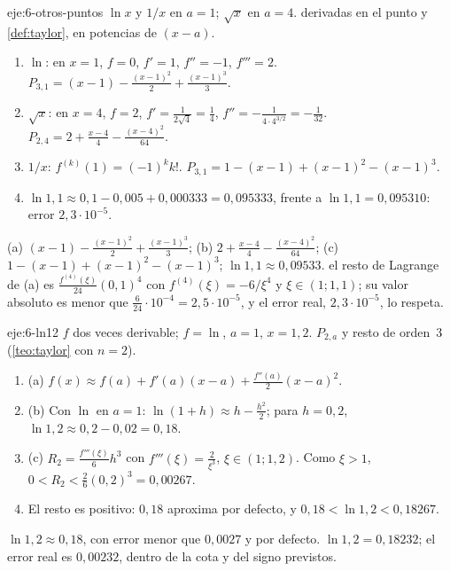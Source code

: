 \begin{solucion}{eje:6-otros-puntos}
\datos $\ln x$ y $1/x$ en $a=1$; $\sqrt x$ en $a=4$.
\planteamiento derivadas en el punto y \cref{def:taylor}, en potencias de $(x-a)$.
\pasos
\begin{enumerate}[label=(\alph*)]
  \item $\ln$: en $x=1$, $f=0$, $f'=1$, $f''=-1$, $f'''=2$. $P_{3,1}=(x-1)-\frac{(x-1)^{2}}{2}+\frac{(x-1)^{3}}{3}$.
  \item $\sqrt x$: en $x=4$, $f=2$, $f'=\frac{1}{2\sqrt4}=\frac14$, $f''=-\frac{1}{4\cdot4^{3/2}}=-\frac{1}{32}$. $P_{2,4}=2+\frac{x-4}{4}-\frac{(x-4)^{2}}{64}$.
  \item $1/x$: $f^{(k)}(1)=(-1)^{k}k!$. $P_{3,1}=1-(x-1)+(x-1)^{2}-(x-1)^{3}$.
  \item $\ln1{,}1\approx0{,}1-0{,}005+0{,}000333=0{,}095333$, frente a $\ln1{,}1=0{,}095310$: error $2{,}3\cdot10^{-5}$.
\end{enumerate}
\resultado (a) $(x-1)-\frac{(x-1)^{2}}{2}+\frac{(x-1)^{3}}{3}$; (b) $2+\frac{x-4}{4}-\frac{(x-4)^{2}}{64}$; (c) $1-(x-1)+(x-1)^{2}-(x-1)^{3}$; $\ln1{,}1\approx0{,}09533$.
\comprobacion el resto de Lagrange de (a) es $\frac{f^{(4)}(\xi)}{24}(0{,}1)^{4}$ con $f^{(4)}(\xi)=-6/\xi^{4}$ y $\xi\in(1;1{,}1)$; su valor absoluto es menor que $\frac{6}{24}\cdot10^{-4}=2{,}5\cdot10^{-5}$, y el error real, $2{,}3\cdot10^{-5}$, lo respeta.
\end{solucion}

\begin{solucion}{eje:6-ln12}
\datos $f$ dos veces derivable; $f=\ln$, $a=1$, $x=1{,}2$.
\planteamiento $P_{2,a}$ y resto de orden~3 (\cref{teo:taylor} con $n=2$).
\pasos
\begin{enumerate}[label=\arabic*.]
  \item (a) $f(x)\approx f(a)+f'(a)(x-a)+\frac{f''(a)}{2}(x-a)^{2}$.
  \item (b) Con $\ln$ en $a=1$: $\ln(1+h)\approx h-\frac{h^{2}}{2}$; para $h=0{,}2$, $\ln1{,}2\approx0{,}2-0{,}02=0{,}18$.
  \item (c) $R_2=\frac{f'''(\xi)}{6}h^{3}$ con $f'''(\xi)=\frac{2}{\xi^{3}}$, $\xi\in(1;1{,}2)$. Como $\xi>1$, $0<R_2<\frac{2}{6}(0{,}2)^{3}=0{,}00267$.
  \item El resto es positivo: $0{,}18$ aproxima por defecto, y $0{,}18<\ln1{,}2<0{,}18267$.
\end{enumerate}
\resultado $\ln1{,}2\approx0{,}18$, con error menor que $0{,}0027$ y por defecto.
\comprobacion $\ln1{,}2=0{,}18232$; el error real es $0{,}00232$, dentro de la cota y del signo previstos.
\end{solucion}

